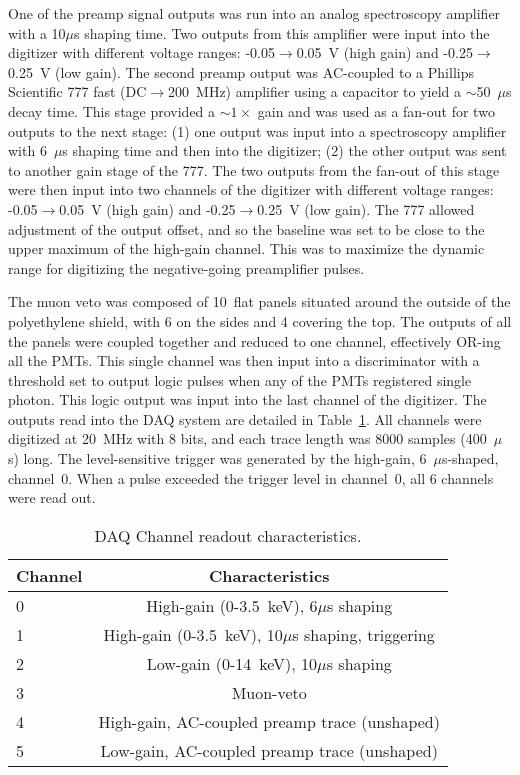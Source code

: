 One of the preamp signal outputs was run into an analog spectroscopy amplifier with a 10$\mu$s shaping time.  Two outputs from this amplifier were input into the digitizer with different voltage ranges: -0.05$\to$0.05~V (high gain) and -0.25$\to$0.25~V (low gain).  The second preamp output was AC-coupled to a Phillips Scientific 777 fast (DC$\to$200~MHz) amplifier using a capacitor to yield a $\sim$50~$\mu$s decay time.  This stage provided a $\sim1\times$ gain and was used as a fan-out for two outputs to the next stage: (1) one output was input into a spectroscopy amplifier with 6~$\mu$s shaping time and then into the digitizer; (2) the other output was sent to another gain stage of the 777.  The two outputs from the fan-out of this stage were then input into two channels of the digitizer with different voltage ranges: -0.05$\to$0.05~V (high gain) and -0.25$\to$0.25~V (low gain).  The 777 allowed adjustment of the output offset, and so the baseline was set to be close to the upper maximum of the high-gain channel.  This was to maximize the dynamic range for digitizing the negative-going preamplifier pulses.  

The muon veto was composed of 10~flat panels situated around the outside of the polyethylene shield, with 6 on the sides and 4 covering the top.  The outputs of all the panels were coupled together and reduced to one channel, effectively OR-ing all the PMTs.  This single channel was then input into a discriminator with a threshold set to output logic pulses when any of the PMTs registered single photon.  This logic output was input into the last channel of the digitizer.  The outputs read into the DAQ system are detailed in Table~\ref{tab:SoudanDAQTable}.  All channels were digitized at 20~MHz with 8 bits, and each trace length was 8000 samples (400~$\mu$s) long.  The level-sensitive trigger was generated by the high-gain, 6~$\mu$s-shaped, channel~0.  When a pulse exceeded the trigger level in channel~0, all 6 channels were read out.  

	\begin{table}
		\centering
		\begin{tabular}{|l|c|}
			\hline
			Channel & Characteristics \\
			\hline
			\hline
			0 & High-gain (0-3.5~keV), 6$\mu$s shaping \\
			\hline
			1 & High-gain (0-3.5~keV), 10$\mu$s shaping, triggering \\
			\hline
			2 & Low-gain (0-14~keV), 10$\mu$s shaping \\
			\hline
			3 & Muon-veto \\
			\hline
			4 & High-gain, AC-coupled preamp trace (unshaped) \\
			\hline
			5 & Low-gain, AC-coupled preamp trace (unshaped) \\
			\hline
		\end{tabular}
		\caption[DAQ Channel readout characteristics]
		{DAQ Channel readout characteristics. }
		\label{tab:SoudanDAQTable}
	\end{table}

